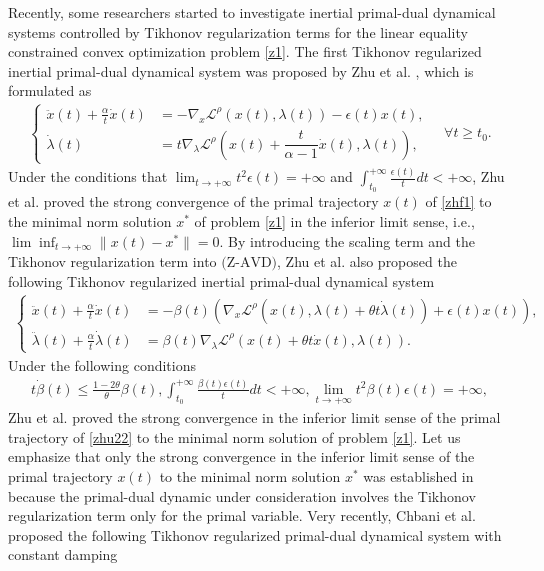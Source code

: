 \documentclass[review]{elsarticle}
\begin{document}
Recently, some researchers started to investigate  inertial primal-dual dynamical systems controlled by Tikhonov regularization terms for the linear equality constrained convex optimization problem \eqref{z1}.  The first Tikhonov regularized inertial primal-dual dynamical system was proposed by Zhu et al. \cite{zhuhufang1}, which is formulated as
	\begin{eqnarray}\label{zhf1}
		\begin{cases}
			\ddot{x}(t)+\frac{\alpha}{t}\dot{x}(t)&=-\nabla_x \mathcal{L}^{\rho}(x(t),\lambda(t))-\epsilon(t)x(t),\\
			\dot{\lambda}(t)&=t\nabla_{\lambda} \mathcal{L}^{\rho}(x(t)+\dfrac{t}{\alpha-1}\dot{x}(t),\lambda(t)),
		\end{cases}\quad\forall t\ge t_0.
	\end{eqnarray}
Under the conditions that  $\lim_{t\to+\infty}t^2\epsilon(t)= +\infty$ and $\int_{t_0}^{+\infty}\frac{\epsilon(t)}{t}dt<+\infty$, Zhu et al. \cite{zhuhufang1} proved  the strong convergence of the primal trajectory $x(t)$ of \eqref{zhf1}  to the minimal norm solution   $x^*$ of problem \eqref{z1}  in the inferior limit sense, i.e.,  $\lim\inf_{t\rightarrow+\infty}\|x(t)-x^*\|=0$. By introducing the scaling term and  the Tikhonov regularization term into $\text{(Z-AVD)}$,  Zhu et al. \cite{zhuhufang2} also proposed the following  Tikhonov regularized inertial primal-dual dynamical system
\begin{eqnarray}\label{zhu22}
	\begin{cases}
		\ddot{x}(t)+\frac{\alpha}{t}\dot{x}(t)&=-\beta(t)\left(\nabla_x\mathcal{L}^{\rho}(x(t),\lambda(t)+\theta t\dot{\lambda}(t)) +\epsilon(t)x(t)\right),\\
		\ddot{\lambda}(t)+\frac{\alpha}{t}\dot{\lambda}(t)&=\beta(t)\nabla_{\lambda}\mathcal{L}^{\rho}(x(t)+\theta t\dot{x}(t),\lambda(t)).
	\end{cases}
\end{eqnarray}
Under the following  conditions
\begin{eqnarray*}
	t\dot{\beta}(t)\leq\frac{1-2\theta}{\theta}\beta(t), \int_{t_{0}}^{+\infty}\frac{\beta(t)\epsilon(t)}{t}dt<+\infty, \lim_{t\to+\infty}t^2\beta(t)\epsilon(t)= +\infty,
	\end{eqnarray*}
Zhu et al. \cite{zhuhufang2} proved the strong convergence   in the inferior limit sense  of the primal trajectory of  \eqref{zhu22} to the minimal norm solution of problem \eqref{z1}.  Let us emphasize that  only the strong convergence  in the inferior limit sense of the primal trajectory $x(t)$ to the minimal norm solution $x^*$ was established in \cite{zhuhufang1,zhuhufang2} because the primal-dual dynamic under consideration involves the Tikhonov regularization term only for the primal variable.  Very recently,  Chbani et al. \cite{ChbaniRBOn(2024)} proposed the following Tikhonov regularized primal-dual dynamical system with constant damping    
\end{document}
